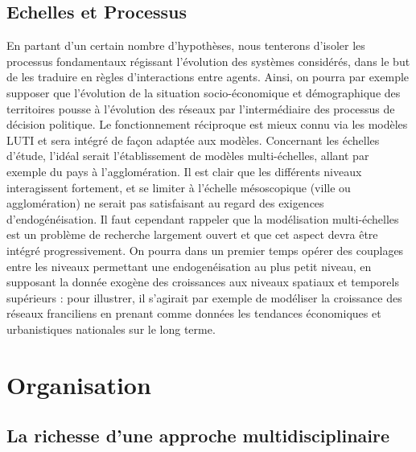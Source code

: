 \documentclass[french,12pt]{article}
\begin{document}
\subsection{Echelles et Processus}

En partant d'un certain nombre d'hypothèses, nous tenterons d'isoler les processus fondamentaux régissant l'évolution des systèmes considérés, dans le but de les traduire en règles d'interactions entre agents. Ainsi, on pourra par exemple supposer que l'évolution de la situation socio-économique et démographique des territoires pousse à l'évolution des réseaux par l'intermédiaire des processus de décision politique. Le fonctionnement réciproque est mieux connu via les modèles LUTI et sera intégré de façon adaptée aux modèles. Concernant les échelles d'étude, l'idéal serait l'établissement de modèles multi-échelles, allant par exemple du pays à l’agglomération. Il est clair que les différents niveaux interagissent fortement, et se limiter à l’échelle mésoscopique (ville ou agglomération) ne serait pas satisfaisant au regard des exigences d'endogénéisation. Il faut cependant rappeler que la modélisation multi-échelles est un problème de recherche largement ouvert et que cet aspect devra être intégré progressivement. On pourra dans un premier temps opérer des couplages entre les niveaux permettant une endogenéisation au plus petit niveau, en supposant la donnée exogène des croissances aux niveaux spatiaux et temporels supérieurs : pour illustrer, il s'agirait par exemple de modéliser la croissance des réseaux franciliens en prenant comme données les tendances économiques et urbanistiques nationales sur le long terme.

\bigskip

\section{Organisation}


\subsection{La richesse d'une approche multidisciplinaire}
\end{document}
